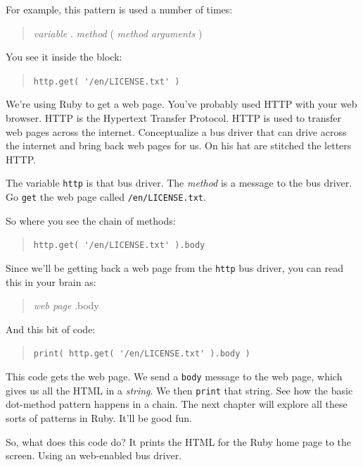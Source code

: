 \documentclass[10pt,twoside]{report}
\begin{document}
For example, this pattern is used a number of times:

\begin{quote}
{\em variable} . {\em method} ( {\em method arguments} )\end{quote}


You see it inside the block:

\begin{quote}
\lstinline[breaklines=true]|http.get( '/en/LICENSE.txt' )|\end{quote}


We're using Ruby to get a web page.  You've probably used HTTP with
your web browser.  HTTP is the Hypertext Transfer Protocol.  HTTP is
used to transfer web pages across the internet.  Conceptualize a bus
driver that can drive across the internet and bring back web pages for
us.  On his hat are stitched the letters HTTP.

The variable \lstinline[breaklines=true]|http| is that bus driver.
The {\em method} is a message to the bus driver.  Go
\lstinline[breaklines=true]|get| the web page called
\lstinline[breaklines=true]|/en/LICENSE.txt|.

So where you see the chain of methods:

\begin{quote}
\lstinline[breaklines=true]|http.get( '/en/LICENSE.txt' ).body|\end{quote}


Since we'll be getting back a web page from the
\lstinline[breaklines=true]|http| bus driver, you can read this in
your brain as:

\begin{quote}
{\em web page} .body\end{quote}


And this bit of code:

\begin{quote}
\lstinline[breaklines=true]|print( http.get( '/en/LICENSE.txt' ).body )|\end{quote}


This code gets the web page.  We send a
\lstinline[breaklines=true]|body| message to the web page, which gives
us all the HTML in a {\em string}.  We then
\lstinline[breaklines=true]|print| that string.  See how the basic
dot-method pattern happens in a chain.  The next chapter will explore
all these sorts of patterns in Ruby.  It'll be good fun.

So, what does this code do?  It prints the HTML for the Ruby home page
to the screen.  Using an web-enabled bus driver.
\end{document}
